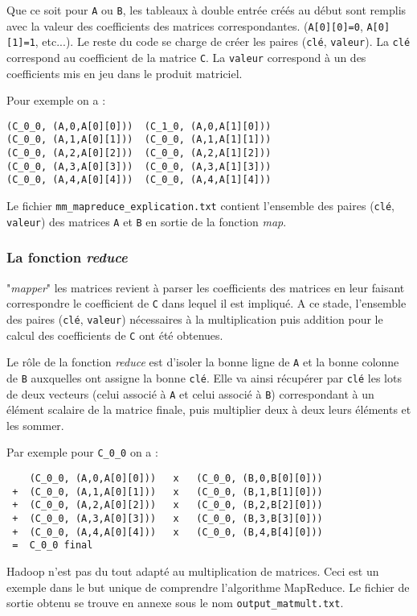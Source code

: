 \par Que ce soit pour \texttt{A} ou \texttt{B}, les tableaux à double entrée créés au début sont remplis avec la valeur des coefficients des matrices correspondantes. (\texttt{A[0][0]=0}, \texttt{A[0][1]=1}, etc...). Le reste du code se charge de créer les paires (\texttt{clé}, \texttt{valeur}). La \texttt{clé} correspond au coefficient de la matrice \texttt{C}. La \texttt{valeur} correspond à un des coefficients mis en jeu dans le produit matriciel.

\par Pour exemple on a :
\begin{verbatim}
(C_0_0, (A,0,A[0][0]))  (C_1_0, (A,0,A[1][0]))
(C_0_0, (A,1,A[0][1]))  (C_0_0, (A,1,A[1][1]))
(C_0_0, (A,2,A[0][2]))  (C_0_0, (A,2,A[1][2]))
(C_0_0, (A,3,A[0][3]))  (C_0_0, (A,3,A[1][3]))
(C_0_0, (A,4,A[0][4]))  (C_0_0, (A,4,A[1][4]))
\end{verbatim}

\par Le fichier \texttt{mm\_mapreduce\_explication.txt} contient l'ensemble des paires (\texttt{clé}, \texttt{valeur}) des matrices \texttt{A} et \texttt{B} en sortie de la fonction \emph{map}.

\subsubsection{La fonction \emph{reduce}}

\par "\emph{mapper}" les matrices revient à parser les coefficients des matrices en leur faisant correspondre le coefficient de \texttt{C} dans lequel il est impliqué. A ce stade, l'ensemble des paires (\texttt{clé}, \texttt{valeur}) nécessaires à la multiplication puis addition pour le calcul des coefficients de \texttt{C} ont été obtenues.

\par Le rôle de la fonction \emph{reduce} est d'isoler la bonne ligne de \texttt{A} et la bonne colonne de \texttt{B} auxquelles ont assigne la bonne \texttt{clé}. Elle va ainsi récupérer par \texttt{clé} les lots de deux vecteurs (celui associé à \texttt{A} et celui associé à \texttt{B}) correspondant à un élément scalaire de la matrice finale, puis multiplier deux à deux leurs éléments et les sommer.

\par Par exemple pour \texttt{C\_0\_0} on a :

\begin{verbatim}
    (C_0_0, (A,0,A[0][0]))   x   (C_0_0, (B,0,B[0][0]))
 +  (C_0_0, (A,1,A[0][1]))   x   (C_0_0, (B,1,B[1][0]))
 +  (C_0_0, (A,2,A[0][2]))   x   (C_0_0, (B,2,B[2][0]))
 +  (C_0_0, (A,3,A[0][3]))   x   (C_0_0, (B,3,B[3][0]))
 +  (C_0_0, (A,4,A[0][4]))   x   (C_0_0, (B,4,B[4][0]))
 =  C_0_0 final
\end{verbatim}

\par Hadoop n'est pas du tout adapté au multiplication de matrices. Ceci est un exemple dans le but unique de comprendre l'algorithme MapReduce. Le fichier de sortie obtenu se trouve en annexe sous le nom \texttt{output\_matmult.txt}.

